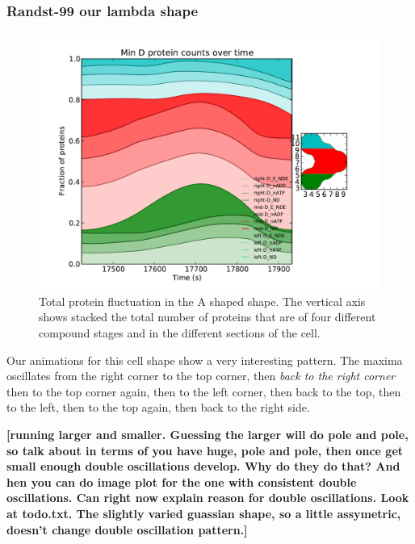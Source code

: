 \documentclass[letterpaper,twocolumn,amsmath,amssymb,pre]{revtex4-1}
\newcommand{\red}[1]{{\bf \color{red} #1}}
\newcommand{\fixme}[1]{\red{[#1]}}
\begin{document}
\subsubsection{Randst-99 our lambda shape}
\begin{figure}
  \includegraphics[width=\columnwidth]{../data/shape-randst/plots/box-plot_D--randst-25-600-600-9900-1500}

  \caption{Total protein fluctuation in the A shaped shape.  The vertical axis shows stacked the total number
    of proteins that are of four different compound stages and in the
    different sections of the cell.}
  \label{total-oscillation-randst-96-plot}
\end{figure}



Our animations for this cell shape show a very interesting pattern.
The maxima oscillates from the right corner to the top corner, then
\emph{back to the right corner} then to the top corner again, then to
the left corner, then back to the top, then to the left, then to the
top again, then back to the right side.

\fixme{running larger and smaller.  Guessing the larger will do pole
  and pole, so talk about in terms of you have huge, pole and pole,
  then once get small enough double oscillations develop.  Why do they
  do that?  And hen you can do image plot for the one with consistent
  double oscillations.  Can right now explain reason for double
  oscillations.  Look at todo.txt.  The slightly varied guassian shape,
  so a little assymetric, doesn't change double oscillation pattern.}
\end{document}
